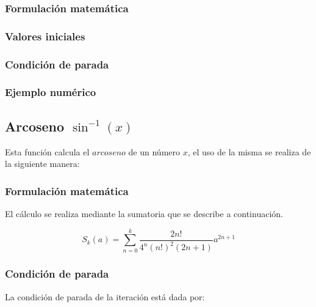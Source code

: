 \documentclass[10pt,a4paper]{article}
\begin{document}
	\begin{center}
	\end{center}
	
	\subsubsection{Formulación matemática}
	
	\subsubsection{Valores iniciales}
	
	\subsubsection{Condición de parada}
	
	\subsubsection{Ejemplo numérico}
	
	\subsection{Arcoseno $\sin^{-1}(x)$}
	
	Esta función calcula el $arcoseno$ de un número $x$, el uso de la misma se realiza de la siguiente manera:
	
	\begin{center}
	\end{center}
	
	\subsubsection{Formulación matemática}
	
	El cálculo se realiza mediante la sumatoria que se describe a continuación.
	
	\begin{equation}\label{key22}
		S_{k}(a) = \sum_{n=0}^{k}\frac{2n!}{4^{n}(n!)^{2}(2n + 1)}a^{2n+1}
	\end{equation}
	
	\subsubsection{Condición de parada}
	
	La condición de parada de la iteración está dada por: 
	
\end{document}
